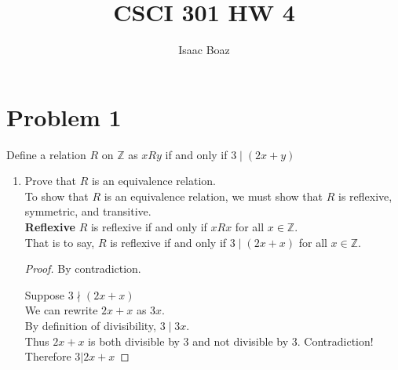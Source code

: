 \documentclass{article}
\title{\vspace{-5ex}CSCI 301 HW 4}
\author{Isaac Boaz}
\begin{document}
\maketitle

\section*{Problem 1}
Define a relation \(R\) on \(\mathbb{Z}\) as \(xRy\) if and only if \(3 \mid (2x + y)\)

\begin{enumerate}[label=\alph*.]
    \item Prove that \(R\) is an equivalence relation. \\
          To show that \(R\) is an equivalence relation, we must show that \(R\) is reflexive, symmetric, and transitive. \\

          \textbf{Reflexive}
          \(R\) is reflexive if and only if \(xRx\) for all \(x \in \mathbb{Z}\). \\
          That is to say, \(R\) is reflexive if and only if \(3 \mid (2x + x)\) for all \(x \in \mathbb{Z}\).
          \begin{proof}
              By contradiction.

              Suppose \(3 \nmid (2x + x)\) \\
              We can rewrite \(2x + x\) as \(3x\). \\
              By definition of divisibility, \(3 \mid 3x\). \\
              Thus \(2x + x\) is both divisible by \(3\) and not divisible by \(3\). Contradiction! \\
              Therefore \(3 | 2x + x\)
          \end{proof}


\end{enumerate}
\end{document}
